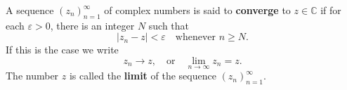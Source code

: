 A sequence $(z_n)_{n=1}^{\infty}$ of complex numbers is said to \textbf{converge} to $z \in \mathbb{C}$ if for each $\varepsilon > 0$, there is an integer $N$ such that
$$|z_n - z| < \varepsilon \quad \text{whenever } n \geq N.$$
If this is the case we write
$$z_n \rightarrow z, \quad \text{or} \quad \lim_{n \rightarrow \infty} z_n = z.$$
The number $z$ is called the \textbf{limit} of the sequence $(z_n)_{n=1}^{\infty}$.
